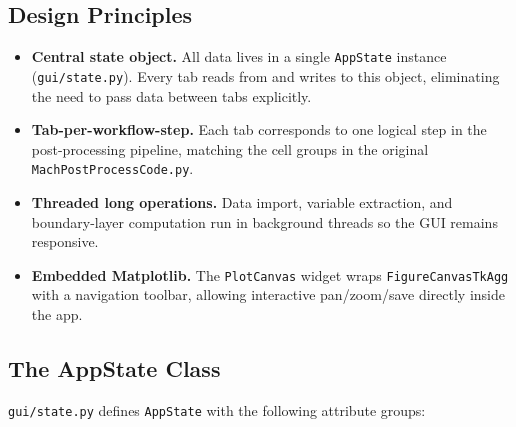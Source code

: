 \documentclass[11pt,letterpaper]{article}
\begin{document}
\subsection{Design Principles}

\begin{itemize}[leftmargin=2em]
  \item \textbf{Central state object.}  All data lives in a single
        \texttt{AppState} instance (\texttt{gui/state.py}).  Every tab reads
        from and writes to this object, eliminating the need to pass data
        between tabs explicitly.

  \item \textbf{Tab-per-workflow-step.}  Each tab corresponds to one logical
        step in the post-processing pipeline, matching the cell groups in the
        original \texttt{MachPostProcessCode.py}.

  \item \textbf{Threaded long operations.}  Data import, variable extraction,
        and boundary-layer computation run in background threads so the GUI
        remains responsive.

  \item \textbf{Embedded Matplotlib.}  The \texttt{PlotCanvas} widget wraps
        \texttt{FigureCanvasTkAgg} with a navigation toolbar, allowing
        interactive pan/zoom/save directly inside the app.
\end{itemize}

\subsection{The AppState Class}

\texttt{gui/state.py} defines \texttt{AppState} with the following attribute
groups:
\end{document}
